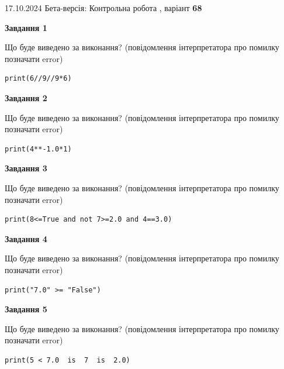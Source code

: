 \documentclass[12pt, ukrainian]{article}
\begin{document}
{\Large{17.10.2024 Бета-версія: Контрольна робота , варіант  \No \textbf { 68 }\par}}
{
\begin {large}
{\begin {center}\textbf{Завдання 1}\end {center}}

Що буде виведено за виконання? (повідомлення інтерпретатора про помилку позначати error)\par
\begin{verbatim}
print(6//9//9*6)
\end{verbatim}

{\begin {center}\textbf{Завдання 2}\end {center}}

Що буде виведено за виконання? (повідомлення інтерпретатора про помилку позначати error)\par
\begin{verbatim}
print(4**-1.0*1)
\end{verbatim}

{\begin {center}\textbf{Завдання 3}\end {center}}

Що буде виведено за виконання? (повідомлення інтерпретатора про помилку позначати error)\par
\begin{verbatim}
print(8<=True and not 7>=2.0 and 4==3.0)
\end{verbatim}

{\begin {center}\textbf{Завдання 4}\end {center}}

Що буде виведено за виконання? (повідомлення інтерпретатора про помилку позначати error)\par
\begin{verbatim}
print("7.0" >= "False")
\end{verbatim}

{\begin {center}\textbf{Завдання 5}\end {center}}

Що буде виведено за виконання? (повідомлення інтерпретатора про помилку позначати error)\par
\begin{verbatim}
print(5 < 7.0  is  7  is  2.0)
\end{verbatim}


\end{large}}
\end{document}
